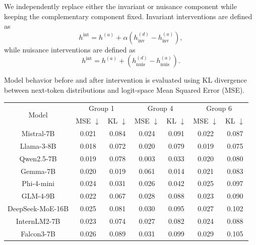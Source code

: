 We independently replace either the invariant or nuisance component while keeping the complementary component fixed. Invariant interventions are defined as
\[
h^{\mathrm{int}}
=
h^{(a)}
+
\alpha
\left(
h_{\mathrm{inv}}^{(d)}
-
h_{\mathrm{inv}}^{(a)}
\right),
\]
while nuisance interventions are defined as
\[
h^{\mathrm{int}}
=
h^{(a)}
+
\left(
h_{\mathrm{nuis}}^{(d)}
-
h_{\mathrm{nuis}}^{(a)}
\right).
\]

Model behavior before and after intervention is evaluated using KL divergence between next-token distributions and logit-space Mean Squared Error (MSE).

\begin{table}[h]
\centering
\small
\setlength{\tabcolsep}{5pt}
\renewcommand{\arraystretch}{1.2}
\begin{tabular}{c|cc|cc|cc}
\hline
\multirow{2}{*}{Model} 
& \multicolumn{2}{c|}{Group 1}
& \multicolumn{2}{c|}{Group 4}
& \multicolumn{2}{c}{Group 6} \\

& MSE $\downarrow$ & KL $\downarrow$
& MSE $\downarrow$ & KL $\downarrow$
& MSE $\downarrow$ & KL $\downarrow$ \\
\hline

Mistral-7B 
& 0.021 & 0.084 
& 0.024 & 0.091 
& 0.022 & 0.087 \\

Llama-3-8B 
& 0.018 & 0.072 
& 0.020 & 0.079 
& 0.019 & 0.075 \\

Qwen2.5-7B
& 0.019 & 0.078
& 0.003 & 0.033
& 0.020 & 0.080 \\

Gemma-7B
& 0.020 & 0.019
& 0.061 & 0.014
& 0.021 & 0.083 \\

Phi-4-mini
& 0.024 & 0.031
& 0.026 & 0.042
& 0.025 & 0.097 \\

GLM-4-9B
& 0.022 & 0.067
& 0.028 & 0.088
& 0.023 & 0.090 \\

DeepSeek-MoE-16B
& 0.025 & 0.081
& 0.030 & 0.095
& 0.027 & 0.102 \\

InternLM2-7B
& 0.023 & 0.074
& 0.027 & 0.082
& 0.024 & 0.088 \\

Falcon3-7B
& 0.026 & 0.089
& 0.031 & 0.099
& 0.029 & 0.105 \\


\end{tabular}
\end{table}

